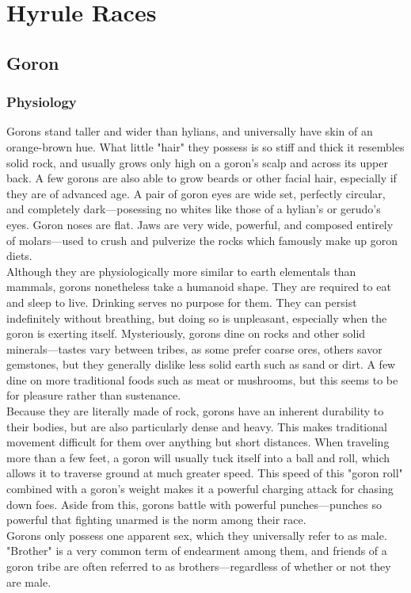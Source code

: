 \documentclass[10pt,twoside,twocolumn,openany]{book}
\begin{document}
\selectfont %

\chapter{Hyrule Races}

\section{Goron}

\subsection{Physiology}
Gorons stand taller and wider than hylians, and universally have skin of an orange-brown hue. What little "hair" they possess is so stiff and thick it resembles solid rock, and usually grows only high on a goron's scalp and across its upper back. A few gorons are also able to grow beards or other facial hair, especially if they are of advanced age. A pair of goron eyes are wide set, perfectly circular, and completely dark—posessing no whites like those of a hylian's or gerudo's eyes. Goron noses are flat. Jaws are very wide, powerful, and composed entirely of molars—used to crush and pulverize the rocks which famously make up goron diets.\\
Although they are physiologically more similar to earth elementals than mammals, gorons nonetheless take a humanoid shape. They are required to eat and sleep to live. Drinking serves no purpose for them. They can persist indefinitely without breathing, but doing so is unpleasant, especially when the goron is exerting itself. Mysteriously, gorons dine on rocks and other solid minerals—tastes vary between tribes, as some prefer coarse ores, others savor gemstones, but they generally dislike less solid earth such as sand or dirt. A few dine on more traditional foods such as meat or mushrooms, but this seems to be for pleasure rather than sustenance.\\
Because they are literally made of rock, gorons have an inherent durability to their bodies, but are also particularly dense and heavy. This makes traditional movement difficult for them over anything but short distances. When traveling more than a few feet, a goron will usually tuck itself into a ball and roll, which allows it to traverse ground at much greater speed. This speed of this "goron roll" combined with a goron's weight makes it a powerful charging attack for chasing down foes. Aside from this, gorons battle with powerful punches—punches so powerful that fighting unarmed is the norm among their race.\\
Gorons only possess one apparent sex, which they universally refer to as male. "Brother" is a very common term of endearment among them, and friends of a goron tribe are often referred to as brothers—regardless of whether or not they are male.
\end{document}
